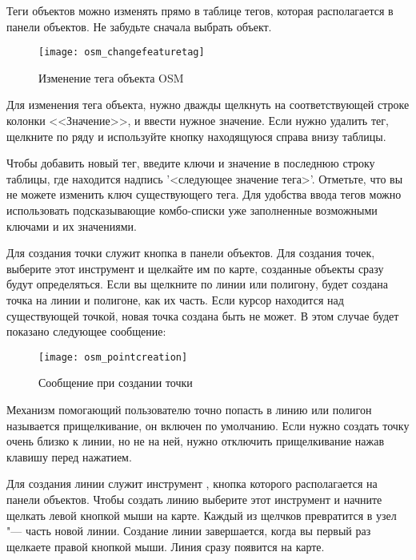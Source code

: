 
Теги объектов можно изменять прямо в таблице тегов, которая
располагается в панели объектов. Не забудьте сначала выбрать объект.

\begin{figure}[ht]
   \centering
   \texttt{[image: osm\_changefeaturetag]}
   \caption{Изменение тега объекта OSM \nixcaption}\label{fig:osmchfeattag}
\end{figure}

Для изменения тега объекта, нужно дважды щелкнуть на соответствующей
строке колонки <<Значение>>, и ввести нужное значение. Если нужно удалить
тег, щелкните по ряду и используйте кнопку 
находящуюся справа внизу таблицы.

Чтобы добавить новый тег, введите ключи и значение в последнюю строку
таблицы, где находится надпись '<следующее значение тега>'. Отметьте,
что вы не можете изменить ключ существующего тега. Для удобства ввода
тегов можно использовать подсказывающие комбо-списки уже заполненные
возможными ключами и их значениями.


Для создания точки служит кнопка 
в панели объектов. Для создания точек, выберите этот инструмент и
щелкайте им по карте, созданные объекты сразу будут определяться. Если
вы щелкните по линии или полигону, будет создана точка на линии и
полигоне, как их часть. Если курсор находится над существующей точкой,
новая точка создана быть не может. В этом случае будет показано
следующее сообщение:

\begin{figure}[ht]
   \centering
   \texttt{[image: osm\_pointcreation]}
   \caption{Сообщение при создании точки \nixcaption}\label{fig:osmpoicreat}
\end{figure}

Механизм помогающий пользователю точно попасть в линию или полигон
называется прищелкивание, он включен по умолчанию. Если нужно создать
точку очень близко к линии, но не на ней, нужно отключить прищелкивание
нажав клавишу  перед нажатием.


Для создания линии служит инструмент ,
кнопка которого располагается на панели объектов. Чтобы создать линию
выберите этот инструмент и начните щелкать левой кнопкой мыши на карте.
Каждый из щелчков превратится в узел "--- часть новой линии. Создание
линии завершается, когда вы первый раз щелкаете правой кнопкой мыши.
Линия сразу появится на карте.

